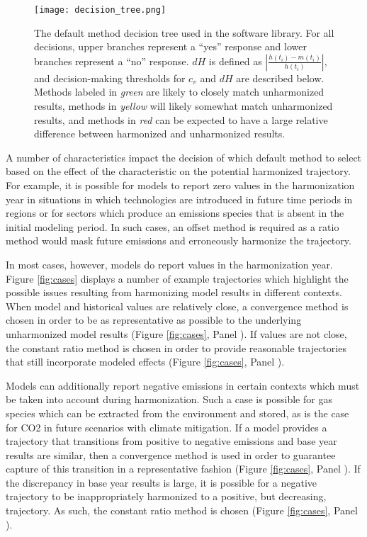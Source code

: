\begin{figure}
  \begin{center}
    \texttt{[image: decision\_tree.png]}
    \caption[]{
      \label{fig:decision_tree}
      The default method decision tree used in the  software
% 
% 
      library. For all decisions, upper branches represent a ``yes'' response
      and lower branches represent a ``no'' response. $dH$ is defined as
      $\left|\frac{h(t_i) - m(t_i)}{h(t_i)}\right|$, and decision-making
      thresholds for $c_v$ and $dH$ are described below. Methods labeled in
      \textit{green} are likely to closely match unharmonized results, methods
      in \textit{yellow} will likely somewhat match unharmonized results, and
      methods in \textit{red} can be expected to have a large relative
      difference between harmonized and unharmonized results.}
  \end{center}
\end{figure}

A number of characteristics impact the decision of which default method to
select based on the effect of the characteristic on the potential harmonized
trajectory. For example, it is possible for models to report zero values in the
harmonization year in situations in which technologies are introduced in future
time periods in regions or for sectors which produce an emissions species that
is absent in the initial modeling period. In such cases, an offset method is
required as a ratio method would mask future emissions and erroneously harmonize
the trajectory. 

In most cases, however, models do report values in the harmonization
year. Figure \ref{fig:cases} displays a number of example trajectories which
highlight the possible issues resulting from harmonizing model results in
different contexts. When model and historical values are relatively close, a
convergence method is chosen in order to be as representative as possible to the
underlying unharmonized model results (Figure \ref{fig:cases}, Panel
). If values are not close, the constant ratio method is chosen in order
to provide reasonable trajectories that still incorporate modeled effects
(Figure \ref{fig:cases}, Panel ). 

Models can additionally report negative emissions in certain contexts which must
be taken into account during harmonization. Such a case is possible for gas
species which can be extracted from the environment and stored, as is the case
for CO2 in future scenarios with climate mitigation. If a model provides a
trajectory that transitions from positive to negative emissions and base year
results are similar, then a convergence method is used in order to guarantee
capture of this transition in a representative fashion (Figure \ref{fig:cases},
Panel ). If the discrepancy in base year results is large, it is
possible for a negative trajectory to be inappropriately harmonized to a
positive, but decreasing, trajectory. As such, the constant ratio method is
chosen (Figure \ref{fig:cases}, Panel ).

